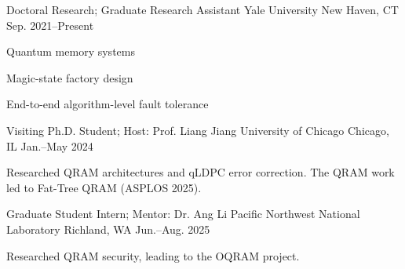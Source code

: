 \begin{cventries}
  \cventry
    {Doctoral Research; Graduate Research Assistant}
    {Yale University}
    {New Haven, CT}
    {Sep. 2021--Present}
    {\begin{cvitems}
      \item {Quantum memory systems}
      \item {Magic-state factory design}
      \item {End-to-end algorithm-level fault tolerance}
    \end{cvitems}}
  \cventry
    {Visiting Ph.D. Student; Host: Prof. Liang Jiang}
    {University of Chicago}
    {Chicago, IL}
    {Jan.--May 2024}
    {\begin{cvitems}
      \item {Researched QRAM architectures and qLDPC error correction. The QRAM work led to Fat-Tree QRAM (ASPLOS 2025).}
    \end{cvitems}}
  \cventry
    {Graduate Student Intern; Mentor: Dr. Ang Li}
    {Pacific Northwest National Laboratory}
    {Richland, WA}
    {Jun.--Aug. 2025}
    {\begin{cvitems}
      \item {Researched QRAM security, leading to the OQRAM project.}
    \end{cvitems}}
\end{cventries}
